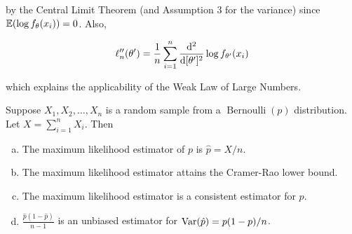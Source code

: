 by the Central Limit Theorem (and Assumption 3 for the variance) since \( \E( \log f_\theta(x_i) ) = 0\). Also,

\[
\ell_n''(\theta') = \frac{1}{n} \sum_{i=1}^n \deriv{^2}{[\theta']^2} \log f_{\theta'}(x_i)
\]

which explains the applicability of the Weak Law of Large Numbers.

\begin{proposition} Suppose \(X_1, X_2, \ldots, X_n\) is a random sample from a \(\operatorname{Bernoulli}(p)\) distribution. Let \(X =\sum_{i=1}^n X_i\). Then

\begin{enumerate}[(a)]

\item The maximum likelihood estimator of \(p\) is \( \hat{p} = X/n\).

\item The maximum likelihood estimator attains the Cramer-Rao lower bound.

\item The maximum likelihood estimator is a consistent estimator for \(p\).

\item \( \frac{\hat{p}(1-\hat{p})}{n-1}\) is an unbiased estimator for \(\Var(\hat{p}) = p(1-p)/n\). 

\end{enumerate}

\end{proposition}


